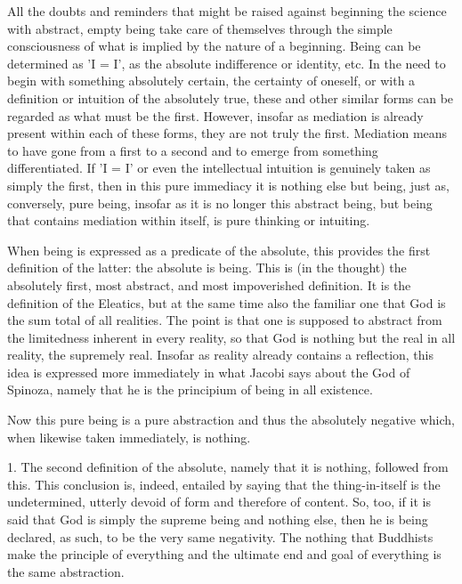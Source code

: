     All the doubts and reminders that might be raised against
    beginning the science with abstract, empty being
    take care of themselves through the simple consciousness of
    what is implied by the nature of a beginning.
    Being can be determined as 'I = I',
    as the absolute indifference or identity, etc.
    In the need to begin with something absolutely certain,
    the certainty of oneself,
    or with a definition
    or intuition of the absolutely true,
    these and other similar forms can be
    regarded as what must be the first.
    However, insofar as mediation is
    already present within each of these forms,
    they are not truly the first.
    Mediation means to have gone from a first to a second
    and to emerge from something differentiated.
    If 'I = I' or even the intellectual intuition is
    genuinely taken as simply the first,
    then in this pure immediacy
    it is nothing else but being, just as,
    conversely, pure being, insofar as it is
    no longer this abstract being,
    but being that contains mediation within itself,
    is pure thinking or intuiting.

    When being is expressed as a predicate of the absolute,
    this provides the first definition of the latter:
    the absolute is being.
    This is (in the thought) the absolutely first,
    most abstract, and most impoverished definition.
    It is the definition of the Eleatics,
    but at the same time also the familiar one
    that God is the sum total of all realities.
    The point is that one is supposed to abstract
    from the limitedness inherent in every reality,
    so that God is nothing but the real in all reality,
    the supremely real.
    Insofar as reality already contains a reflection,
    this idea is expressed more immediately in what
    Jacobi says about the God of Spinoza, namely
    that he is the principium of being in all existence.

Now this pure being is a pure abstraction
and thus the absolutely negative
which, when likewise taken immediately, is nothing.

    1. The second definition of the absolute,
    namely that it is nothing, followed from this.
    This conclusion is, indeed, entailed by saying
    that the thing-in-itself is the undetermined,
    utterly devoid of form and therefore of content.
    So, too, if it is said that God is simply
    the supreme being and nothing else,
    then he is being declared, as such,
    to be the very same negativity.
    The nothing that Buddhists make the principle of everything
    and the ultimate end and goal of everything is the same abstraction.

